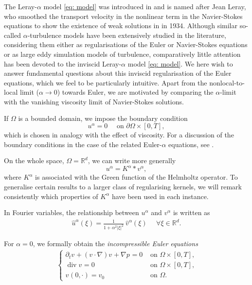 \documentclass{amsart}
\begin{document}
    
The Leray-$\alpha$ model \eqref{eq: model} was introduced in \cite{Cheskidov.2005} and is named after Jean Leray, who smoothed the transport velocity in the nonlinear term in the Navier-Stokes equations to show the existence of weak solutions in \cite{Leray.1934} in 1934. Although similar so-called $\alpha$-turbulence models have been extensively studied in the literature, considering them either as regularisations of the Euler or Navier-Stokes equations or as large eddy simulation models of turbulence, comparatively little attention has been devoted to the inviscid Leray-$\alpha$ model \eqref{eq: model}. We here wish to answer fundamental questions about this inviscid regularisation of the Euler equations, which we feel to be particularly intuitive. Apart from the nonlocal-to-local limit ($\alpha\to0$) towards Euler, we are motivated by comparing the $\alpha$-limit with the vanishing viscosity limit of Navier-Stokes solutions.

If $\Omega$ is a bounded domain, we impose the boundary condition
\begin{equation}
    u^{\alpha}= 0 \quad \text{ on } \partial \Omega \times [0,T],
\end{equation}
which is chosen in analogy with the effect of viscosity. For a discussion of the boundary conditions in the case of the related Euler-$\alpha$ equations, see \cite{LopesFilho.2015}.

On the whole space, $\Omega=\mathbb{R}^d$, we can write more generally
\begin{equation}
\label{eq: general Kalpha}
    u^{\alpha}=K^{\alpha}*v^{\alpha},
\end{equation}
where $K^{\alpha}$ is associated with the Green function of the Helmholtz operator. To generalise certain results to a larger class of regularising kernels, we will remark consistently which properties of $K^{\alpha}$ have been used in each instance.

In Fourier variables, the relationship between $u^{\alpha}$ and $v^{\alpha}$ is written as
   \begin{equation}
   \label{eq: alpha kernel}
       \begin{aligned}
           \hat{u}^{\alpha}(\xi)=\frac{1}{1+\alpha^2|\xi|^2}\ \hat{v}^{\alpha}(\xi) \ \ \  \ \ \ \forall \xi \in \mathbb{R}^d.
       \end{aligned}
   \end{equation} 
   

For $\alpha=0$, we formally obtain the \emph{incompressible Euler equations}
 \begin{align}\
 \label{eq: Euler}
        \begin{cases}
        \partial_t  v^{} + (v^{} \cdot \nabla) v^{} +\nabla p^{}=0  &\text{ on } \Omega\times [0,T], \\
        \operatorname{div} v^{}=0 &\text{ on } \Omega\times [0,T], \\
        v^{}(0,\cdot)  = v^{}_{0}   &\text{ on } \Omega.
        \end{cases}
    \end{align} 
    
\end{document}
